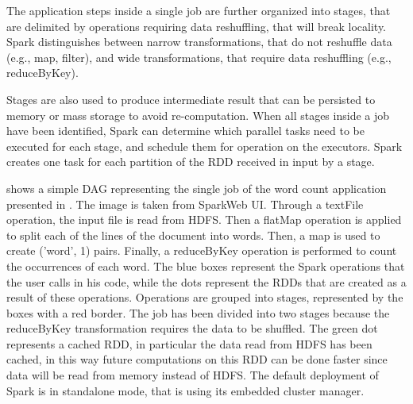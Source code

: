 The application steps inside a single job are further organized into stages, that are delimited by operations requiring data reshuffling, that will break locality. Spark distinguishes between narrow transformations, that do not reshuffle data (e.g., map, filter), and wide transformations, that require data reshuffling (e.g., reduceByKey). 

Stages are also used to produce intermediate result that can be persisted to memory or mass storage to avoid re-computation. When all stages inside a job have been identified, Spark can determine which parallel tasks need to be executed for each stage, and schedule them for operation on the executors. Spark creates one task for each partition of the RDD received in input by a stage.



 shows a simple DAG representing the single job of the word count application presented in  \cite{misc:SparkApplication}. The image is taken from SparkWeb UI. Through a textFile operation, the input file is read from HDFS. Then a flatMap operation is applied to split each of the lines of the document into words. Then, a map is used to create (’word’, 1) pairs. Finally, a reduceByKey operation is performed to count the occurrences of each word. The blue boxes represent the Spark operations that the user calls in his code, while the dots represent the RDDs that are created as a result of these operations. Operations are grouped into stages, represented by the boxes with a red border. The job has been divided into two stages because the reduceByKey transformation requires the data to be shuffled. The green dot represents a cached RDD, in particular the data read from HDFS has been cached, in this way future computations on this RDD can be done faster since data will be read from memory instead of HDFS. The default deployment of Spark is in standalone mode, that is using its embedded cluster manager. 

